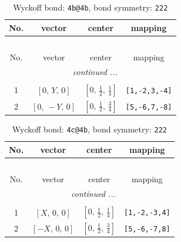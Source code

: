 \documentclass[fleqn,8pt]{jsarticle}
\begin{document}
\renewcommand{\arraystretch}{1.2}
\begin{longtable}{cccc}
\caption{Wyckoff bond: {\tt 4b@4b}, bond symmetry: {\tt 222}}
 \\
 \hline \hline
No. & vector & center & mapping \\ \hline \endfirsthead

\multicolumn{3}{l}{\tablename\ \thetable{}} \\
 \hline \hline
No. & vector & center & mapping \\ \hline \endhead

 \hline \hline
\multicolumn{3}{r}{\footnotesize\it continued ...} \\ \endfoot

 \hline \hline
\multicolumn{3}{r}{} \\ \endlastfoot

1 & $\left[ 0,\, Y,\, 0 \right]$ & $\left[ 0,\, \frac{1}{2},\, \frac{1}{4} \right]$ & {\tt [1,-2,3,-4]} \\ \hline
2 & $\left[ 0,\, - Y,\, 0 \right]$ & $\left[ 0,\, \frac{1}{2},\, \frac{3}{4} \right]$ & {\tt [5,-6,7,-8]} \\
\end{longtable}
\renewcommand{\arraystretch}{1.2}
\begin{longtable}{cccc}
\caption{Wyckoff bond: {\tt 4c@4b}, bond symmetry: {\tt 222}}
 \\
 \hline \hline
No. & vector & center & mapping \\ \hline \endfirsthead

\multicolumn{3}{l}{\tablename\ \thetable{}} \\
 \hline \hline
No. & vector & center & mapping \\ \hline \endhead

 \hline \hline
\multicolumn{3}{r}{\footnotesize\it continued ...} \\ \endfoot

 \hline \hline
\multicolumn{3}{r}{} \\ \endlastfoot

1 & $\left[ X,\, 0,\, 0 \right]$ & $\left[ 0,\, \frac{1}{2},\, \frac{1}{4} \right]$ & {\tt [1,-2,-3,4]} \\ \hline
2 & $\left[ - X,\, 0,\, 0 \right]$ & $\left[ 0,\, \frac{1}{2},\, \frac{3}{4} \right]$ & {\tt [5,-6,-7,8]} \\
\end{longtable}
\renewcommand{\arraystretch}{1.2}
\end{document}
